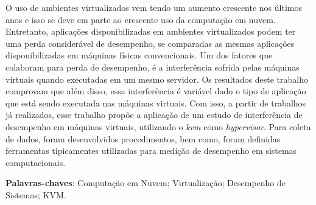 \begin{resumo}
 O uso de ambientes virtualizados vem tendo um aumento crescente nos últimos anos e isso se deve em parte ao crescente uso da computação em nuvem. Entretanto, aplicações disponibilizadas em ambientes virtualizados podem ter uma perda considerável de desempenho, se comparadas as mesmas aplicações disponibilizadas em máquinas físicas convencionais. Um dos fatores que colaboram para perda de desempenho, é a interferência sofrida pelas máquinas virtuais quando executadas em um mesmo servidor. Os resultados deste trabalho comprovam que além disso, essa interferência é variável dado o tipo de aplicação que está sendo executada nas máquinas virtuais. Com isso, a partir de trabalhos já realizados, esse trabalho propõe a aplicação de um estudo de interferência de desempenho em máquinas virtuais, utilizando o \textit{kvm} como \textit{hypervisor}. Para coleta de dados, foram desenvolvidos procedimentos, bem como, foram definidas ferramentas tipicamentes utilizadas para medição de desempenho em sistemas computacionais.  %




 \vspace{\onelineskip}
    
 \noindent
 \textbf{Palavras-chaves}: Computação em Nuvem; Virtualização; Desempenho de Sistemas; KVM.
\end{resumo}
